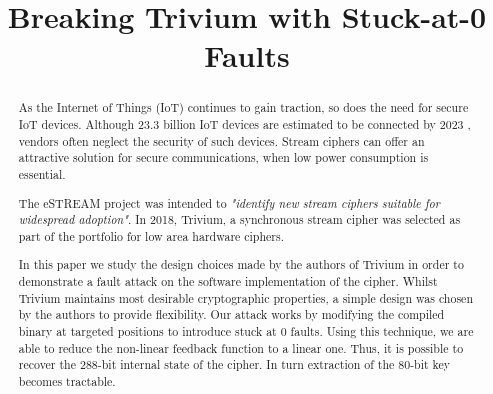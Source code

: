 \documentclass[conference]{IEEEtran}
\begin{document}
\title{Breaking Trivium with Stuck-at-0 Faults}

\author{
\and
{}
\and
{}
}

\maketitle

\begin{abstract}
As the Internet of Things (IoT) continues to gain traction, so does the need for secure IoT devices. Although 23.3 billion IoT devices are estimated to be connected by 2023 \cite{iot}, vendors often neglect the security of such devices. Stream ciphers can offer an attractive solution for secure communications, when low power consumption is essential. 

The eSTREAM project was intended to \textit{"identify new stream ciphers suitable for widespread adoption"}.\cite{call} In 2018, Trivium, a synchronous stream cipher was selected as part of the portfolio for low area hardware ciphers. 

In this paper we study the design choices made by the authors of Trivium in order to demonstrate a fault attack on the software implementation of the cipher. Whilst Trivium maintains most desirable cryptographic properties, a simple design was chosen by the authors to provide flexibility. Our attack works by modifying the compiled binary at targeted positions to introduce stuck at 0 faults. Using this technique, we are able to reduce the non-linear feedback function to a linear one. Thus, it is possible to recover the 288-bit internal state of the cipher. In turn extraction of the 80-bit key becomes tractable.
\end{abstract}
\end{document}
